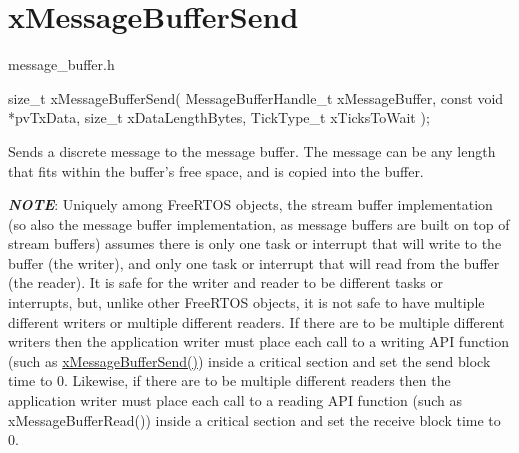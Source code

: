 \hypertarget{group__xMessageBufferSend}{}\section{x\+Message\+Buffer\+Send}
\label{group__xMessageBufferSend}
message\+\_\+buffer.\+h


\begin{DoxyPre}
size\_t xMessageBufferSend( MessageBufferHandle\_t xMessageBuffer,
                           const void *pvTxData,
                           size\_t xDataLengthBytes,
                           TickType\_t xTicksToWait );

\begin{DoxyPre}\end{DoxyPre}
\end{DoxyPre}



\begin{DoxyPre}
\begin{DoxyPre}   Sends a discrete message to the message buffer.  The message can be any
   length that fits within the buffer's free space, and is copied into the
   buffer.\end{DoxyPre}
\end{DoxyPre}



\begin{DoxyPre}
\begin{DoxyPre}   {\itshape {\bfseries NOTE}}:  Uniquely among FreeRTOS objects, the stream buffer
   implementation (so also the message buffer implementation, as message buffers
   are built on top of stream buffers) assumes there is only one task or
   interrupt that will write to the buffer (the writer), and only one task or
   interrupt that will read from the buffer (the reader).  It is safe for the
   writer and reader to be different tasks or interrupts, but, unlike other
   FreeRTOS objects, it is not safe to have multiple different writers or
   multiple different readers.  If there are to be multiple different writers
   then the application writer must place each call to a writing API function
   (such as \hyperlink{message__buffer_8h_a858f6da6fe24a226c45caf1634ea1605}{xMessageBufferSend()}) inside a critical section and set the send
   block time to 0.  Likewise, if there are to be multiple different readers
   then the application writer must place each call to a reading API function
   (such as xMessageBufferRead()) inside a critical section and set the receive
   block time to 0.\end{DoxyPre}
\end{DoxyPre}



